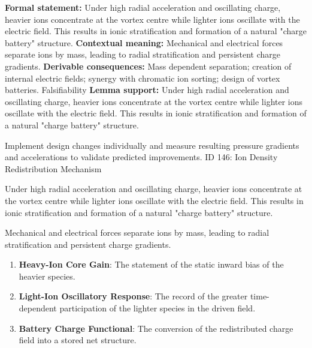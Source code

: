 \begingroup\footnotesize\setlength{\emergencystretch}{3em}\sloppy
\textbf{Formal statement:} Under high radial acceleration and oscillating charge, heavier ions concentrate at the vortex centre while lighter ions oscillate with the electric field. This results in ionic stratification and formation of a natural "charge battery" structure.
\textbf{Contextual meaning:} Mechanical and electrical forces separate ions by mass, leading to radial stratification and persistent charge gradients.
\textbf{Derivable consequences:} Mass dependent separation; creation of internal electric fields; synergy with chromatic ion sorting; design of vortex batteries. Falsifiability
\textbf{Lemma support:} Under high radial acceleration and oscillating charge, heavier ions concentrate at the vortex centre while lighter ions oscillate with the electric field. This results in ionic stratification and formation of a natural "charge battery" structure.\par
\endgroup

Implement design changes individually and measure resulting pressure gradients and accelerations to validate predicted improvements. ID 146: Ion Density Redistribution Mechanism

Under high radial acceleration and oscillating charge, heavier ions concentrate at the vortex centre while lighter ions oscillate with the electric field. This results in ionic stratification and formation of a natural "charge battery" structure.

Mechanical and electrical forces separate ions by mass, leading to radial stratification and persistent charge gradients.
\endgroup

\begin{enumerate}[leftmargin=1.6em,itemsep=6pt,topsep=4pt]
\item \textbf{Heavy-Ion Core Gain}: The statement of the static inward bias of the heavier species.
\item \textbf{Light-Ion Oscillatory Response}: The record of the greater time-dependent participation of the lighter species in the driven field.
\item \textbf{Battery Charge Functional}: The conversion of the redistributed charge field into a stored net structure.
\end{enumerate}

